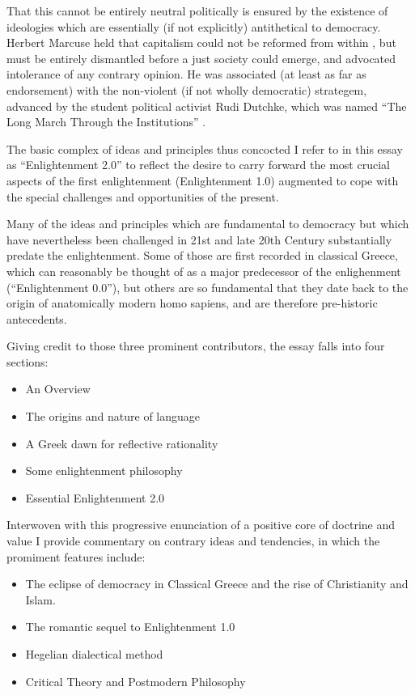 \documentclass[10pt,titlepage]{article}
\begin{document}
That this cannot be entirely neutral politically is ensured by the existence of ideologies which are essentially (if not explicitly) antithetical to democracy.
Herbert Marcuse held that capitalism could not be reformed from within \cite{marcuse-repressive, marcuse-liberation}, but must be entirely dismantled before a just society could emerge, and advocated intolerance of any contrary opinion.
He was associated (at least as far as endorsement) with the non-violent (if not wholly democratic) strategem, advanced by the student political activist Rudi Dutchke, which was named ``The Long March Through the Institutions'' \cite{sidwell-long}.

The basic complex of ideas and principles thus concocted I refer to in this essay as ``Enlightenment 2.0'' to reflect the desire to carry forward the most crucial aspects of the first enlightenment (Enlightenment 1.0) augmented to cope with the special challenges and opportunities of the present.

Many of the ideas and principles which are fundamental to democracy but which have nevertheless been challenged in 21st and late 20th Century substantially predate the enlightenment.
Some of those are first recorded in classical Greece, which can reasonably be thought of as a major predecessor of the enlighenment (``Enlightenment 0.0''), but others are so fundamental that they date back to the origin of anatomically modern homo sapiens, and are therefore pre-historic antecedents.

Giving credit to those three prominent contributors, the essay falls into four sections:

\begin{itemize}
\item An Overview
\item The origins and nature of language
\item A Greek dawn for reflective rationality
\item Some enlightenment philosophy
\item Essential Enlightenment 2.0
\end{itemize}

Interwoven with this progressive enunciation of a positive core of doctrine and value I provide commentary on contrary ideas and tendencies, in which the promiment features include:

\begin{itemize}
\item The eclipse of democracy in Classical Greece and the rise of Christianity and Islam.
\item The romantic sequel to Enlightenment 1.0
\item Hegelian dialectical method
  \item Critical Theory and Postmodern Philosophy
\end{itemize}
\end{document}

